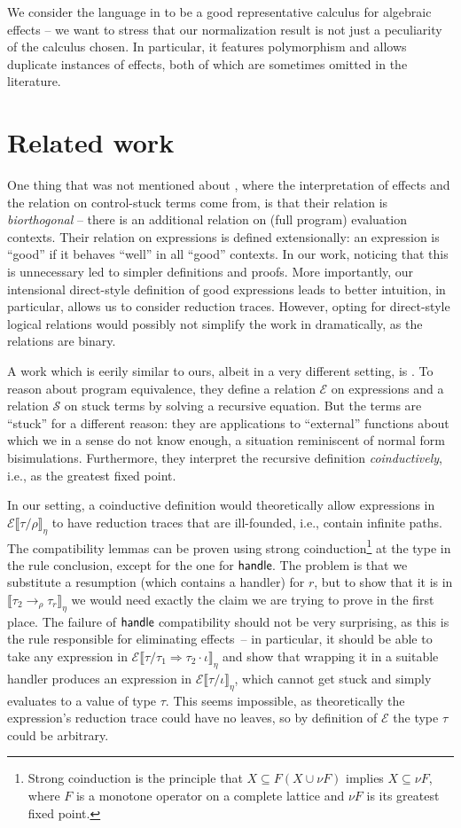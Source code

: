 \documentclass[a4paper, 11pt,titlepage, openright, twoside]{report}
\newcommand{\keyword}[1]{\textsf{\textup{#1}}}
\newcommand{\Handle}{\keyword{handle}\;}
\newcommand{\E}{\mathcal{E}}
\renewcommand{\S}{\mathcal{S}}
\newcommand{\+}{\enspace}
\begin{document}
We consider the language in \cite{hwc} to be a good representative
calculus for algebraic effects
– we want to stress that our normalization result is not just a
peculiarity of the calculus chosen.
In particular, it features polymorphism and allows duplicate instances of effects,
both of which are sometimes omitted in the literature.

\section{Related work}

One thing that was not mentioned about \cite{hwc}, where the interpretation of effects
and the relation on control-stuck terms come from,
is that their relation is {\em biorthogonal}
– there is an additional relation on (full program) evaluation contexts.
Their relation on expressions is defined extensionally:
an expression is ``good'' if it behaves ``well'' in all ``good'' contexts.
In our work, noticing that this is unnecessary led to simpler definitions and proofs.
More importantly, our intensional direct-style definition of good expressions leads to
better intuition, in particular, allows us to consider reduction traces.
However, opting for direct-style logical relations would possibly not simplify the work
in \cite{hwc} dramatically,
as the relations are binary.

A work which is eerily similar to ours, albeit in a very different setting, is \cite{marriage}.
To reason about program equivalence,
they define a relation $\E$ on expressions
and a relation $\S$ on stuck terms
by solving a recursive equation.
But the terms are ``stuck'' for a different reason:
they are applications to ``external'' functions about which we in a sense do not know enough,
a situation reminiscent of normal form bisimulations.
Furthermore, they interpret the recursive definition {\em coinductively},
i.e., as the greatest fixed point.

In our setting, a coinductive definition would theoretically allow
expressions in $\E⟦τ/ρ⟧_η$ to have reduction traces that are ill-founded,
i.e., contain infinite paths.
The compatibility lemmas can be proven using strong coinduction\footnote{
	Strong coinduction is the principle that $X ⊆ F(X ∪ νF)$ implies $X ⊆ νF$,
	where $F$ is a monotone operator on a complete lattice and $νF$ is its greatest fixed point.
}
	at the type in the rule conclusion,
except for the one for $\Handle\!\!$.
The problem is that we substitute a resumption
(which contains a handler) for $r$,
but to show that it is in $⟦τ_2 →_ρ τ_r⟧_η$
we would need exactly the claim we are trying to prove in the first place.
The failure of $\Handle\!\!$ compatibility should not be very surprising,
as this is the rule responsible for eliminating effects –
in particular, it should be able to take
any expression in $\E⟦τ/τ_1 \Rightarrow τ_2 · ι⟧_η$ and show that wrapping it in a
suitable handler produces an expression in $\E⟦τ/ι⟧_η$, which cannot get
stuck and simply evaluates to a value of type $τ$.
This seems impossible,
as theoretically the expression's reduction trace could have no
leaves, so by definition of $\E$ the type $τ$ could be arbitrary.
\end{document}
